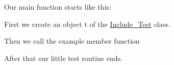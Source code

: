  Our main function starts like this\+: 
\begin{DoxyCodeInclude}

\end{DoxyCodeInclude}
 First we create an object {\ttfamily t} of the \hyperlink{class_include___test}{Include\+\_\+\+Test} class. 
\begin{DoxyCodeInclude}

\end{DoxyCodeInclude}
 Then we call the example member function 
\begin{DoxyCodeInclude}

\end{DoxyCodeInclude}
 After that our little test routine ends. 
\begin{DoxyCodeInclude}

\end{DoxyCodeInclude}
 